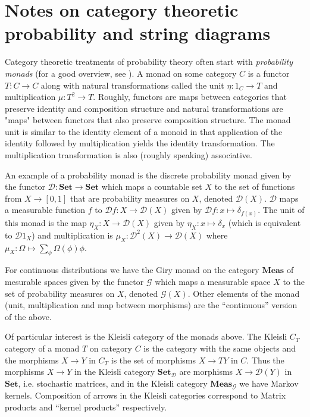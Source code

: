 
\section{Notes on category theoretic probability and string diagrams}

Category theoretic treatments of probability theory often start with \emph{probability monads} (for a good overview, see \citep{jacobs_probability_2018}). A monad on some category $C$ is a functor $T:C\to C$ along with natural transformations called the unit $\eta:1_C\to T$ and multiplication $\mu:T^2\to T$. Roughly, functors are maps between categories that preserve identity and composition structure and natural transformations are "maps" between functors that also preserve composition structure. The monad unit is similar to the identity element of a monoid in that application of the identity followed by multiplication yields the identity transformation. The multiplication transformation is also (roughly speaking) associative.

An example of a probability monad is the discrete probability monad given by the functor $\mathcal{D}:\textbf{Set}\to\textbf{Set}$ which maps a countable set $X$ to the set of functions from $X\to [0,1]$ that are probability measures on $X$, denoted $\mathcal{D}(X)$. $\mathcal{D}$ maps a measurable function $f$ to $\mathcal{D}f:X\to \mathcal{D}(X)$ given by $\mathcal{D}f:x\mapsto \delta_{f(x)}$. The unit of this monad is the map $\eta_X:X\to \mathcal{D}(X)$ given by $\eta_X:x\mapsto \delta_x$ (which is equivalent to $\mathcal{D} 1_X$) and multiplication is $\mu_X:\mathcal{D}^2(X)\to \mathcal{D}(X)$ where $\mu_X:\Omega\mapsto \sum_{\phi} \Omega(\phi) \phi$.

For continuous distributions we have the Giry monad on the category $\textbf{Meas}$ of mesurable spaces given by the functor $\mathcal{G}$ which maps a measurable space $X$ to the set of probability measures on $X$, denoted $\mathcal{G}(X)$. Other elements of the monad (unit, multiplication and map between morphisms) are the ``continuous'' version of the above.

Of particular interest is the Kleisli category of the monads above. The Kleisli $C_T$ category of a monad $T$ on category $C$ is the category with the same objects and the morphisms $X\to Y$ in $C_T$ is the set of morphisms $X\to TY$ in $C$. Thus the morphisms $X\to Y$ in the Kleisli category $\textbf{Set}_{\mathcal{D}}$ are morphisms $X\to \mathcal{D}(Y)$ in $\textbf{Set}$, i.e. stochastic matrices, and in the Kleisli category $\textbf{Meas}_{\mathcal{G}}$ we have Markov kernels. Composition of arrows in the Kleisli categories correspond to Matrix products and ``kernel products'' respectively.

